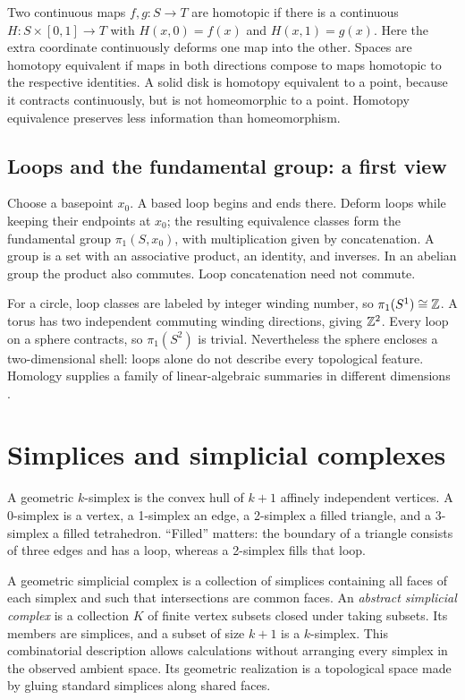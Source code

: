 Two continuous maps $f,g:S\to T$ are homotopic if there is a continuous $H:S\times[0,1]\to T$ with $H(x,0)=f(x)$ and $H(x,1)=g(x)$. Here the extra coordinate continuously deforms one map into the other. Spaces are homotopy equivalent if maps in both directions compose to maps homotopic to the respective identities. A solid disk is homotopy equivalent to a point, because it contracts continuously, but is not homeomorphic to a point. Homotopy equivalence preserves less information than homeomorphism.

\subsection{Loops and the fundamental group: a first view}
Choose a basepoint $x_0$. A based loop begins and ends there. Deform loops while keeping their endpoints at $x_0$; the resulting equivalence classes form the fundamental group $\pi_1(S,x_0)$, with multiplication given by concatenation. A group is a set with an associative product, an identity, and inverses. In an abelian group the product also commutes. Loop concatenation need not commute.

For a circle, loop classes are labeled by integer winding number, so $\pi_1(S^1)\cong\mathbb{Z}$. A torus has two independent commuting winding directions, giving $\mathbb{Z}^2$. Every loop on a sphere contracts, so $\pi_1(S^2)$ is trivial. Nevertheless the sphere encloses a two-dimensional shell: loops alone do not describe every topological feature. Homology supplies a family of linear-algebraic summaries in different dimensions \citep{hatcher2002}.

\section{Simplices and simplicial complexes}
A geometric $k$-simplex is the convex hull of $k+1$ affinely independent vertices. A 0-simplex is a vertex, a 1-simplex an edge, a 2-simplex a filled triangle, and a 3-simplex a filled tetrahedron. ``Filled'' matters: the boundary of a triangle consists of three edges and has a loop, whereas a 2-simplex fills that loop.

A geometric simplicial complex is a collection of simplices containing all faces of each simplex and such that intersections are common faces. An \emph{abstract simplicial complex} is a collection $K$ of finite vertex subsets closed under taking subsets. Its members are simplices, and a subset of size $k+1$ is a $k$-simplex. This combinatorial description allows calculations without arranging every simplex in the observed ambient space. Its geometric realization is a topological space made by gluing standard simplices along shared faces.

